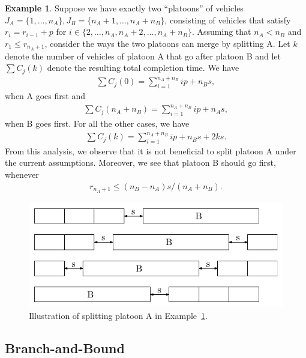 \documentclass{article}
\theoremstyle{definition}
\newtheorem{eg}{Example}[section]
\theoremstyle{plain}
\begin{document}
%
\begin{eg}
  \label{example3}
  Suppose we have exactly two ``platoons'' of vehicles
  $J_{A} = \{ 1, \dots, n_{A}\}, J_{B} = \{ n_{A} + 1, \dots, n_{A} + n_{B}\}$,
  consisting of vehicles that satisfy $r_{i} = r_{i-1} + p$ for
  $i\in\{2, \dots, n_{A}, n_{A}+2, \dots, n_{A} + n_{B}\}$. Assuming that
  $n_{A} < n_{B}$ and $r_{1} \leq r_{n_{A}+1}$, consider the ways the two platoons can merge by splitting A.
  Let $k$ denote the number of vehicles of platoon A that go after platoon B and
  let $\sum C_{j}(k)$ denote the resulting total completion time. We have
  \begin{align*}
    \sum C_{j}(0) = \sum_{i=1}^{n_{A}+n_{B}} ip + n_{B}s ,
  \end{align*}
  when A goes first and
  \begin{align*}
    \sum C_{j}(n_{A}+n_{B}) = \sum_{i=1}^{n_{A}+n_{B}} ip + n_{A}s ,
  \end{align*}
  when B goes first. For all the other cases, we have
  \begin{align*}
    \sum C_{j}(k) = \sum_{i=1}^{n_{A}+n_{B}} ip + n_{B}s + 2ks .
  \end{align*}
  From this analysis, we observe that it is not beneficial to split platoon A under the current assumptions. Moreover, we see that platoon B should go first, whenever
  \begin{align*}
    r_{n_{A} + 1} \leq (n_{B} - n_{A}) s / (n_{A} + n_{B}) .
  \end{align*}
\end{eg}
\begin{figure}
  \centering
  \includegraphics{platoons.pdf}
  \caption{Illustration of splitting platoon A in Example~\ref{example3}.}
  \label{fig:example3}
\end{figure}


\subsection{Branch-and-Bound}
\end{document}
